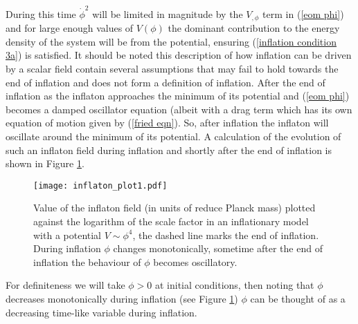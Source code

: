 \documentclass[letterpaper,11pt]{article}
\begin{document}
During this time $\dot{\phi}^2$ will be limited in magnitude by the $V_{,\phi}$ term in (\ref{eom phi}) and for large enough values of $V(\phi)$ the dominant contribution to the energy density of the system will be from the potential, ensuring (\ref{inflation condition 3a}) is satisfied. It should be noted this description of how inflation can be driven by a scalar field contain several assumptions that may fail to hold towards the end of inflation and does not form a definition of inflation.
After the end of inflation as the inflaton approaches the minimum of its potential and (\ref{eom phi}) becomes a damped oscillator equation (albeit with a drag term which has its own equation of motion given by (\ref{fried eqn}). So, after inflation the inflaton will oscillate around the minimum of its potential. A calculation of the evolution of such an inflaton field during inflation and shortly after the end of inflation is shown in Figure \ref{inflation plot}.

\begin{figure}
\begin{center}
\texttt{[image: inflaton\_plot1.pdf]}
\caption{Value of the inflaton field (in units of reduce Planck mass) plotted against the logarithm of the scale factor in an inflationary model with a potential $V \sim \phi^4$, the dashed line marks the end of inflation. During inflation $\phi$ changes monotonically, sometime after the end of inflation the behaviour of $\phi$ becomes oscillatory.}
\label{inflation plot}
\end{center}
\end{figure}

For definiteness we will take $\phi>0$ at initial conditions, then noting that $\phi$ decreases monotonically during inflation (see Figure \ref{inflation plot}) $\phi$ can be thought of as a decreasing time-like variable during inflation.
\end{document}
